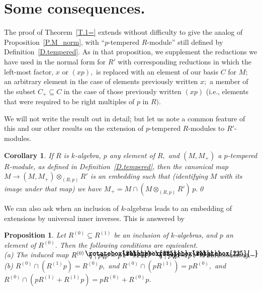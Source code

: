 \documentclass{amsart}
\newtheorem{corollary}[theorem]{Corollary}
\newtheorem{proposition}[theorem]{Proposition}
\DeclareRobustCommand{\lang}{\begin{picture}(5,7)
\put(1.2,2.5){\rotatebox{45}{\line(1,0){6.0}}}
\put(1.2,2.5){\rotatebox{315}{\line(1,0){6.0}}}
\end{picture}\kern.16em}
\DeclareRobustCommand{\rang}{\kern.1em\begin{picture}(5,7)
\put(.1,2.5){\rotatebox{135}{\line(1,0){6.0}}}
\put(.1,2.5){\rotatebox{225}{\line(1,0){6.0}}}
\end{picture}}
\begin{document}
\section{Some consequences.}\label{S.&}

The proof of Theorem~\ref{T.1=} extends without difficulty to give
the analog of Proposition~\ref{P.M_norm}, with
``$\!p\!$-tempered $\!R\!$-module'' still defined by
Definition~\ref{D.tempered}.
As in that proposition, we supplement the reductions we
have used in the normal form for $R'$ with corresponding
reductions in which the left-most factor, $x$ or $(xp),$
is replaced with an element of our basis $C$ for $M;$
an arbitrary element in the case of elements previously written $x;$
a member of the subset $C_+\subseteq C$
in the case of those previously written $(xp)$
(i.e., elements that were required to be
right multiples of $p$ in $R).$

We will not write the result out in detail;
but let us note a common feature of this and our other results on the
extension of $\!p\!$-tempered $\!R\!$-modules to $\!R'\!$-modules.

\begin{corollary}\label{C.tempered}
If $R$ is $\!k\!$-algebra, $p$ any element of $R,$ and
$(M,M_+)$ a $\!p\!$-tempered $\!R\!$-module, as defined
in Definition~\ref{D.tempered}, then the canonical
map $M\to (M,M_+)\otimes_{(R,p)} R'$ is an embedding such
that \textup{(}identifying $M$ with its image under that map\textup{)}
we have $M_+= M\cap(M\otimes_{(R,p)} R')\,p.$\qed
\end{corollary}

We can also ask when an inclusion of $\!k\!$-algebras leads to
an embedding of extensions by universal inner inverses.
This is answered by

\begin{proposition}\label{P.R0,R1}
Let $R^{(0)}\subseteq R^{(1)}$ be an inclusion of $\!k\!$-algebras, and
$p$ an element of $R^{(0)}.$
Then the following conditions are equivalent.\\[.5em]
\textup{(a)}  The induced map $R^{(0)}\lang q\mid pqp=p\rang
\ \to\ R^{(1)}\lang q\mid pqp=p\rang$ is an embedding.\\[.5em]
\textup{(b)}
$R^{(0)}\cap(R^{(1)} p) = R^{(0)} p,$ and
$R^{(0)}\cap(pR^{(1)}) = pR^{(0)},$ and
$R^{(0)}\cap (p R^{(1)}{+}R^{(1)} p) = p R^{(0)}{+}R^{(0)} p.$
\end{proposition}
\end{document}

